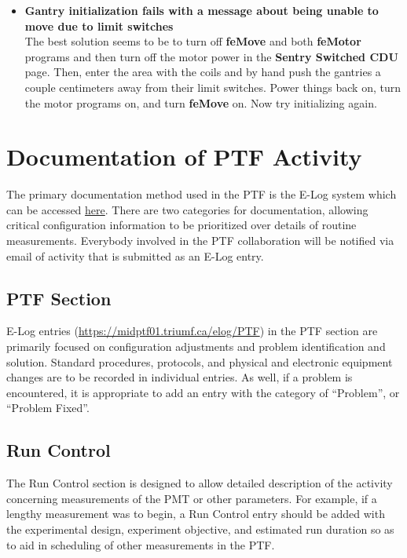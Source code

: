 \documentclass[twoside,letterpaper]{refart}
\begin{document}
\begin{itemize}
	\item \textbf{Gantry initialization fails with a message about being unable to move due to limit switches}\\
	The best solution seems to be to turn off \textbf{feMove} and both \textbf{feMotor} programs and then turn off the motor power in the \textbf{Sentry Switched CDU} page. Then, enter the area with the coils and by hand push the gantries a couple centimeters away from their limit switches. Power things back on, turn the motor programs on, and turn \textbf{feMove} on. Now try initializing again.

\end{itemize}



\clearpage
\section{Documentation of PTF Activity}

The primary documentation method used in the PTF is the E-Log system which can be accessed \href{https://midptf01.triumf.ca/elog/}{here}. There are two categories for documentation, allowing critical configuration information to be prioritized over details of routine measurements. Everybody involved in the PTF collaboration will be notified via email of activity that is submitted as an E-Log entry.

\subsection{PTF Section}

E-Log entries (\url{https://midptf01.triumf.ca/elog/PTF}) in the PTF section are primarily focused on configuration adjustments and problem identification and solution. Standard procedures, protocols, and physical and electronic equipment changes are to be recorded in individual entries. As well, if a problem is encountered, it is appropriate to add an entry with the category of ``Problem'', or ``Problem Fixed''.

\subsection{Run Control}

The Run Control section is designed to allow detailed description of the activity concerning measurements of the PMT or other parameters. For example, if a lengthy measurement was to begin, a Run Control entry should be added with the experimental design, experiment objective, and estimated run duration so as to aid in scheduling of other measurements in the PTF.
\end{document}

